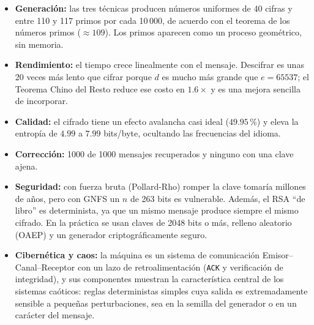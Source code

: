 \documentclass[11pt,a4paper]{article}
\begin{document}
\begin{itemize}
  \item \textbf{Generación:} las tres técnicas producen números uniformes de 40
        cifras y entre 110 y 117 primos por cada 10\,000, de acuerdo con el
        teorema de los números primos ($\approx 109$). Los primos aparecen como
        un proceso geométrico, sin memoria.
  \item \textbf{Rendimiento:} el tiempo crece linealmente con el mensaje.
        Descifrar es unas 20 veces más lento que cifrar porque $d$ es mucho más
        grande que $e = 65537$; el Teorema Chino del Resto reduce ese costo en
        $1.6\times$ y es una mejora sencilla de incorporar.
  \item \textbf{Calidad:} el cifrado tiene un efecto avalancha casi ideal
        ($49.95$\,\%) y eleva la entropía de $4.99$ a $7.99$ bits/byte, ocultando
        las frecuencias del idioma.
  \item \textbf{Corrección:} 1000 de 1000 mensajes recuperados y ninguno con
        una clave ajena.
  \item \textbf{Seguridad:} con fuerza bruta (Pollard-Rho) romper la clave
        tomaría millones de años, pero con GNFS un $n$ de 263 bits es
        vulnerable. Además, el RSA ``de libro'' es determinista, ya que un
        mismo mensaje produce siempre el mismo cifrado. En la práctica se usan
        claves de 2048 bits o más, relleno aleatorio (OAEP) y un generador
        criptográficamente seguro.
  \item \textbf{Cibernética y caos:} la máquina es un sistema de comunicación
        Emisor--Canal--Receptor con un lazo de retroalimentación (\texttt{ACK}
        y verificación de integridad), y sus componentes muestran la
        característica central de los sistemas caóticos: reglas deterministas
        simples cuya salida es extremadamente sensible a pequeñas
        perturbaciones, sea en la semilla del generador o en un carácter del
        mensaje.
\end{itemize}
\end{document}
